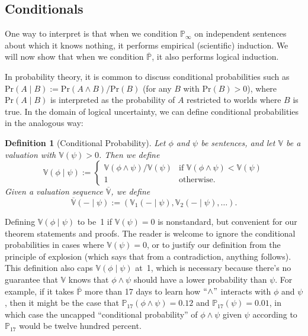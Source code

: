 \documentclass[authordate,onecolumn,noenvironments]{miri-tech-article}
\newtheorem{definition}[theorem]{Definition}
\numberwithin{equation}{subsection}
\newcommand{\quot}[1]{``#1"}
\newcommand{\seq}[1]{{\overline{#1}}}
\newcommand{\any}{-}
\newcommand{\Bayesian}{\mathrm{Pr}}
\newcommand{\BelState}{\mathbb{P}}
\newcommand{\Valuation}{\mathbb{V}}
\newcommand{\pt}{\BelState}
\newcommand{\MP}{\seq{\pt}}
\begin{document}
\subsection{Conditionals}\label{sec:conditionals}

One way to interpret  is that when we condition $\pt_\infty$ on independent sentences about which it knows nothing, it performs empirical (scientific) induction. We will now show that when we condition $\MP$, it also performs logical induction.

In probability theory, it is common to discuss conditional probabilities such as $\Bayesian(A \mid B) := \Bayesian(A \land B)/\Bayesian(B)$ (for any $B$ with $\Bayesian(B)>0$), where $\Bayesian(A \mid B)$ is interpreted as the probability of $A$ restricted to worlds where $B$ is true. In the domain of logical uncertainty, we can define conditional probabilities in the analogous way:

\begin{definition}[Conditional Probability]\label{def:condp}
  Let $\phi$ and $\psi$ be sentences, and let $\Valuation$ be a valuation with $\Valuation(\psi) > 0$. Then we define
  \[
    \Valuation(\phi \mid \psi) :=
    \begin{cases}
      {\Valuation(\phi\wedge\psi)}/{\Valuation(\psi)} & 
      \text{if }\Valuation(\phi\wedge\psi) < \Valuation(\psi)\\
      1 & 
      \mbox{otherwise.}
    \end{cases}
  \]
  Given a valuation sequence $\seq{\Valuation}$, we define
  \[
    \seq{\Valuation}(\any\mid\psi) := (\Valuation_1(\any\mid\psi), \Valuation_2(\any\mid\psi), \ldots).
  \]
\end{definition}

\noindent Defining $\Valuation(\phi\mid\psi)$ to be~1 if $\Valuation(\psi)=0$ is nonstandard, but convenient for our theorem statements and proofs. The reader is welcome to ignore the conditional probabilities in cases where $\Valuation(\psi)=0$, or to justify our definition from the principle of explosion (which says that from a contradiction, anything follows). This definition also caps $\Valuation(\phi\mid\psi)$ at~1, which is necessary because there's no guarantee that $\Valuation$ knows that $\phi \land \psi$ should have a lower probability than $\psi$. For example, if it takes $\MP$ more than 17 days to learn how $\quot{\!\land\!}$ interacts with $\phi$ and $\psi$, then it might be the case that $\pt_{17}(\phi\land\psi)=0.12$ and $\pt_{17}(\psi)=0.01$, in which case the uncapped ``conditional probability'' of $\phi\land\psi$ given $\psi$ according to $\pt_{17}$ would be twelve hundred percent.
\end{document}
